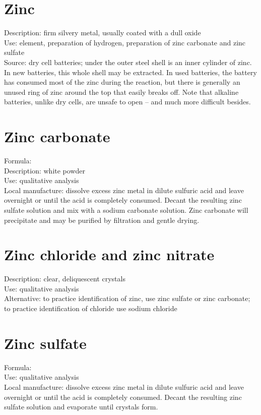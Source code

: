 \section{Zinc}
\label{sec:zinc}
Description: firm silvery metal, 
usually coated with a dull oxide\\
Use: element, 
preparation of hydrogen, 
preparation of zinc carbonate and zinc sulfate\\
Source: dry cell batteries; 
under the outer steel shell is an inner cylinder of zinc. 
In new batteries, 
this whole shell may be extracted. 
In used batteries, 
the battery has consumed most of the zinc during the reaction, 
but there is generally an unused ring of zinc around the top 
that easily breaks off. 
Note that alkaline batteries, 
unlike dry cells, 
are unsafe to open -- and much more difficult besides.

\section{Zinc carbonate}
\label{sec:}
Formula: \\
Description: white powder\\
Use: qualitative analysis\\
Local manufacture: dissolve excess zinc metal 
in dilute sulfuric acid and leave overnight 
or until the acid is completely consumed. 
Decant the resulting zinc sulfate solution and 
mix with a sodium carbonate solution. 
Zinc carbonate will precipitate 
and may be purified by filtration and gentle drying.

\section{Zinc chloride and zinc nitrate}
\label{sec:}
Description: clear, 
deliquescent crystals\\
Use: qualitative analysis\\
Alternative: to practice identification of zinc, 
use zinc sulfate or zinc carbonate; 
to practice identification of chloride use sodium chloride

\section{Zinc sulfate}
\label{sec:}
Formula: \\
Use: qualitative analysis\\
Local manufacture: dissolve excess zinc metal in dilute sulfuric acid 
and leave overnight or until the acid is completely consumed. 
Decant the resulting zinc sulfate solution and evaporate until crystals form.
